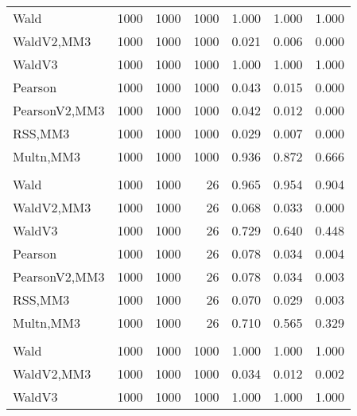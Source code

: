 \documentclass[
]{article}
\begin{document}
\begin{table}[H]
{\begin{tabular}[t]{lrrrrrr}
\hspace{1em}Wald & 1000 & 1000 & 1000 & 1.000 & 1.000 & \vphantom{1} 1.000\\
\hspace{1em}WaldV2,MM3 & 1000 & 1000 & 1000 & 0.021 & 0.006 & 0.000\\
\hspace{1em}WaldV3 & 1000 & 1000 & 1000 & 1.000 & 1.000 & \vphantom{1} 1.000\\
\hspace{1em}Pearson & 1000 & 1000 & 1000 & 0.043 & 0.015 & 0.000\\
\hspace{1em}PearsonV2,MM3 & 1000 & 1000 & 1000 & 0.042 & 0.012 & 0.000\\
\hspace{1em}RSS,MM3 & 1000 & 1000 & 1000 & 0.029 & 0.007 & 0.000\\
\hspace{1em}Multn,MM3 & 1000 & 1000 & 1000 & 0.936 & 0.872 & 0.666\\
\addlinespace[0.3em]
\multicolumn{7}{l}{\textbf{2F 10V}}\\
\hspace{1em}Wald & 1000 & 1000 & 26 & 0.965 & 0.954 & 0.904\\
\hspace{1em}WaldV2,MM3 & 1000 & 1000 & 26 & 0.068 & 0.033 & 0.000\\
\hspace{1em}WaldV3 & 1000 & 1000 & 26 & 0.729 & 0.640 & 0.448\\
\hspace{1em}Pearson & 1000 & 1000 & 26 & 0.078 & 0.034 & 0.004\\
\hspace{1em}PearsonV2,MM3 & 1000 & 1000 & 26 & 0.078 & 0.034 & 0.003\\
\hspace{1em}RSS,MM3 & 1000 & 1000 & 26 & 0.070 & 0.029 & 0.003\\
\hspace{1em}Multn,MM3 & 1000 & 1000 & 26 & 0.710 & 0.565 & 0.329\\
\addlinespace[0.3em]
\multicolumn{7}{l}{\textbf{3F 15V}}\\
\hspace{1em}Wald & 1000 & 1000 & 1000 & 1.000 & 1.000 & 1.000\\
\hspace{1em}WaldV2,MM3 & 1000 & 1000 & 1000 & 0.034 & 0.012 & 0.002\\
\hspace{1em}WaldV3 & 1000 & 1000 & 1000 & 1.000 & 1.000 & 1.000\\

\end{tabular}}
\end{table}
\end{document}
